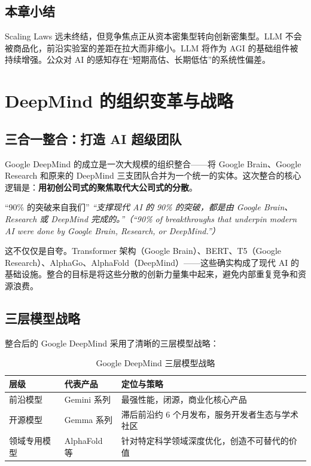 \documentclass[a4paper]{article}
\begin{document}
\subsection{本章小结}

Scaling Laws 远未终结，但竞争焦点正从资本密集型转向创新密集型。LLM 不会被商品化，前沿实验室的差距在拉大而非缩小。LLM 将作为 AGI 的基础组件被持续增强。公众对 AI 的感知存在``短期高估、长期低估''的系统性偏差。

\section{DeepMind 的组织变革与战略}

\subsection{三合一整合：打造 AI 超级团队}

Google DeepMind 的成立是一次大规模的组织整合——将 Google Brain、Google Research 和原来的 DeepMind 三支团队合并为一个统一的实体。这次整合的核心逻辑是：\textbf{用初创公司式的聚焦取代大公司式的分散}。

\begin{importantbox}{``90\% 的突破来自我们''}
\textit{``支撑现代 AI 的 90\% 的突破，都是由 Google Brain、Research 或 DeepMind 完成的。''（``90\% of breakthroughs that underpin modern AI were done by Google Brain, Research, or DeepMind.''）}

这不仅仅是自夸。Transformer 架构（Google Brain）、BERT、T5（Google Research）、AlphaGo、AlphaFold（DeepMind）——这些确实构成了现代 AI 的基础设施。整合的目标是将这些分散的创新力量集中起来，避免内部重复竞争和资源浪费。
\end{importantbox}

\subsection{三层模型战略}

整合后的 Google DeepMind 采用了清晰的三层模型战略：

\begin{table}[H]
\centering
\begin{tabular}{p{} p{} p{}}
\toprule
\textbf{层级} & \textbf{代表产品} & \textbf{定位与策略} \\
\midrule
前沿模型 & Gemini 系列 & 最强性能，闭源，商业化核心产品 \\
开源模型 & Gemma 系列 & 滞后前沿约 6 个月发布，服务开发者生态与学术社区 \\
领域专用模型 & AlphaFold 等 & 针对特定科学领域深度优化，创造不可替代的价值 \\
\bottomrule
\end{tabular}
\caption{Google DeepMind 三层模型战略}
\end{table}
\end{document}

